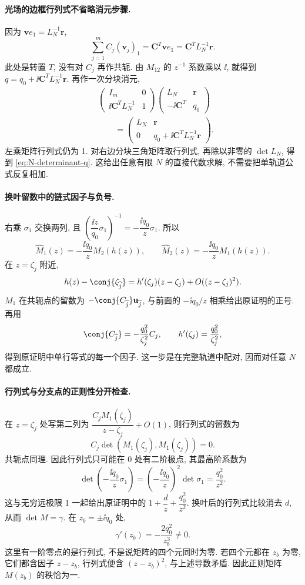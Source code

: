 \paragraph{光场的边框行列式不省略消元步骤.}
因为 $\boldsymbol v e_1=L_N^{-1}\boldsymbol r$,
\[
\sum\limits_{j=1}^{m}C_j(\mathbf v_j)_1
=\boldsymbol C^T\boldsymbol v e_1
=\boldsymbol C^T L_N^{-1}\boldsymbol r.
\]
此处是转置 $T$, 没有对 $C_j$ 再作共轭.
由 $M_{12}$ 的 $z^{-1}$ 系数乘以 $\ii$, 就得到
$q=q_0+\ii\boldsymbol C^T L_N^{-1}\boldsymbol r$.
再作一次分块消元,
\[
\begin{aligned}
&
\begin{pmatrix}I_m&0\\\ii\boldsymbol C^T L_N^{-1}&1\end{pmatrix}
\begin{pmatrix}L_N&\boldsymbol r\\-\ii\boldsymbol C^T&q_0\end{pmatrix}\\
&\qquad=\begin{pmatrix}L_N&\boldsymbol r\\0&q_0+\ii\boldsymbol C^T L_N^{-1}\boldsymbol r\end{pmatrix}.
\end{aligned}
\]
左乘矩阵行列式仍为 1. 对右边分块三角矩阵取行列式,
再除以非零的 $\det L_N$, 得到 \eqref{eq:N-determinant-q}.
这给出任意有限 $N$ 的直接代数求解, 不需要把单轨道公式反复相加.

\paragraph{换叶留数中的链式因子与负号.}
右乘 $\sigma_1$ 交换两列, 且
$\left(\dfrac{\ii z}{q_0}\sigma_1\right)^{-1}
=-\dfrac{\ii q_0}{z}\sigma_1$.
所以
\[
\widehat M_1(z)=-\dfrac{\ii q_0}{z}M_2(h(z)),\qquad
\widehat M_2(z)=-\dfrac{\ii q_0}{z}M_1(h(z)).
\]
在 $z=\zeta_j$ 附近,
\[
h(z)-\conj{\zeta_{\widehat j}}
=h'(\zeta_j)(z-\zeta_j)+O((z-\zeta_j)^2).
\]
$M_1$ 在共轭点的留数为 $-\conj{C_{\widehat j}}\mathbf u_{\widehat j}$,
与前面的 $-\ii q_0/z$ 相乘给出原证明的正号.
再用
\[
\conj{C_{\widehat j}}=-\dfrac{q_0^2}{\zeta_j^2}C_j,
\qquad h'(\zeta_j)=\dfrac{q_0^2}{\zeta_j^2},
\]
得到原证明中单行等式的每一个因子.
这一步是在完整轨道中配对, 因而对任意 $N$ 都成立.

\paragraph{行列式与分支点的正则性分开检查.}
在 $z=\zeta_j$ 处写第二列为
$\dfrac{C_jM_1(\zeta_j)}{z-\zeta_j}+O(1)$,
则行列式的留数为
\[
C_j\det(M_1(\zeta_j),M_1(\zeta_j))=0.
\]
共轭点同理. 因此行列式只可能在 $0$ 处有二阶极点,
其最高阶系数为
\[
\det\left(-\dfrac{\ii q_0}{z}\sigma_1\right)
=\left(-\dfrac{\ii q_0}{z}\right)^2\det\sigma_1
=\dfrac{q_0^2}{z^2}.
\]
这与无穷远极限 1 一起给出原证明中的 $1+\dfrac{d}{z}+\dfrac{q_0^2}{z^2}$.
换叶后的行列式比较消去 $d$, 从而 $\det M=\gamma$.
在 $z_b=\pm\ii q_0$ 处,
\[
\gamma'(z_b)=-\dfrac{2q_0^2}{z_b^3}\ne0.
\]
这里有一阶零点的是行列式, 不是说矩阵的四个元同时为零.
若四个元都在 $z_b$ 为零, 它们都含因子 $z-z_b$,
行列式便含 $(z-z_b)^2$, 与上述导数矛盾.
因此正则矩阵 $M(z_b)$ 的秩恰为一.

